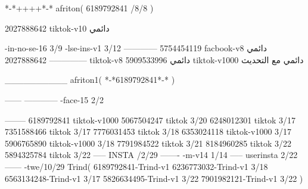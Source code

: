 *-*++++*-*
afriton(
6189792841 /8/8
)

2027888642 tiktok-v10
دائمي

-in-no-se-16 3/9
-lse-ins-v1 3/12
------------
5754454119 facbook-v8
دائمي
--------------
2027888642 tiktok-v8
دائمي
5909533996 tiktok-v1000
دائمي مع التحديث

__________
afriton1(
*-*6189792841*-*
)


------
------------
-face-15 2/2

--------
6189792841 tiktok-v1000
5067504247 tiktok 3/20
6248012301 tiktok 3/17
7351588466 tiktok 3/17
7776031453 tiktok 3/18
6353024118 tiktok-v1000 3/17
5906765890 tiktok-v1000 3/18
7791984522 tiktok 3/21
8184960285 tiktok 3/22
5894325784 tiktok 3/22
-----
 INSTA /2/29
-------
-m-v14 1/14
-----
userinsta 2/22
------
-twe/10/29
Trind(
6189792841-Trind-v1 
6236773032-Trind-v1 3/18
6563134248-Trind-v1 3/17
5826634495-Trind-v1 3/22
7901982121-Trind-v1 3/22
)
